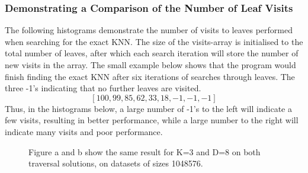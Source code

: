 \subsubsection{Demonstrating a Comparison of the Number of Leaf Visits}

The following histograms demonstrate the number of visits to leaves performed when searching for the exact KNN. The size of the visits-array is initialised to the total number of leaves,  after which each search iteration will store the number of new visits in the array. The small example below shows that the program would finish finding the exact KNN after six iterations of searches through leaves. The three -1’s indicating that no further leaves are visited. 
$$[100, 99, 85, 62, 33, 18, -1, -1, -1]$$
Thus, in the histograms below, a large number of -1's to the left will indicate a few visits, resulting in better performance, while a large number to the right will indicate many visits and poor performance.  



\begin{figure}[H]
  \centering
  \caption{Figure a and b show the same result for K=3 and D=8 on both traversal solutions, on datasets of sizes 1048576.}
  \label{fig:k3d8}
\end{figure}


